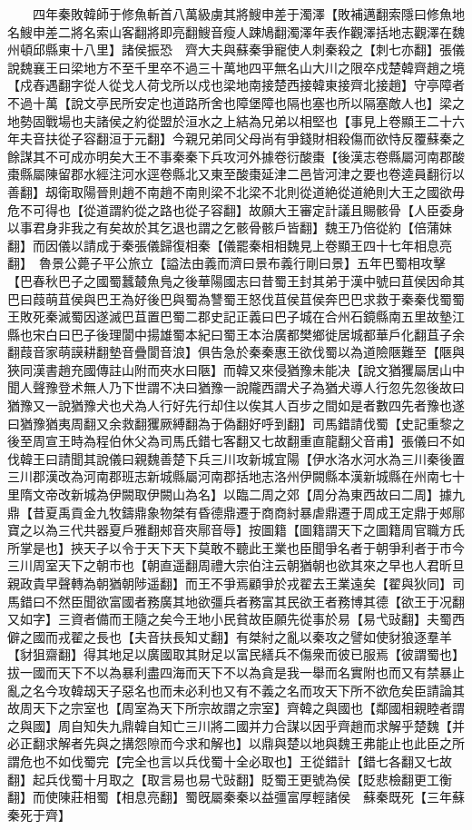 　　四年秦敗韓師于修魚斬首八萬級虜其將䱸申差于濁澤【敗補邁翻索隱曰修魚地名䱸申差二將名索山客翻將即亮翻䱸音瘦人踈鳩翻濁澤年表作觀澤括地志觀澤在魏州頓邱縣東十八里】諸侯振恐　齊大夫與蘇秦爭寵使人刺秦殺之【刺七亦翻】張儀說魏襄王曰梁地方不至千里卒不過三十萬地四平無名山大川之限卒戍楚韓齊趙之境【戍舂遇翻字從人從戈人荷戈所以戍也梁地南接楚西接韓東接齊北接趙】守亭障者不過十萬【說文亭民所安定也道路所舍也障堡障也隔也塞也所以隔塞敵人也】梁之地勢固戰場也夫諸侯之約從盟於洹水之上結為兄弟以相堅也【事見上卷顯王二十六年夫音扶從子容翻洹于元翻】今親兄弟同父母尚有爭錢財相殺傷而欲恃反覆蘇秦之餘謀其不可成亦明矣大王不事秦秦下兵攻河外據卷衍酸棗【後漢志卷縣屬河南郡酸棗縣屬陳留郡水經注河水逕卷縣北又東至酸棗延津二邑皆河津之要也卷逵員翻衍以善翻】刼衛取陽晉則趙不南趙不南則梁不北梁不北則從道絶從道絶則大王之國欲毋危不可得也【從道謂約從之路也從子容翻】故願大王審定計議且賜骸骨【人臣委身以事君身非我之有矣故於其乞退也謂之乞骸骨骸戶皆翻】魏王乃倍從約【倍蒲妹翻】而因儀以請成于秦張儀歸復相秦【儀罷秦相相魏見上卷顯王四十七年相息亮翻】　魯景公薨子平公旅立【謚法由義而濟曰景布義行剛曰景】五年巴蜀相攻擊【巴春秋巴子之國蜀蠶樷魚鳬之後華陽國志曰昔蜀王封其弟于漢中號曰苴侯因命其巴曰葭萌苴侯與巴王為好後巴與蜀為讐蜀王怒伐苴侯苴侯奔巴巴求救于秦秦伐蜀蜀王敗死秦滅蜀因遂滅巴苴置巴蜀二郡史記正義曰巴子城在合州石鏡縣南五里故墊江縣也宋白曰巴子後理閬中揚雄蜀本紀曰蜀王本治廣都樊鄉徙居城都華戶化翻苴子余翻葭音家萌謨耕翻墊音疊閬音浪】俱告急於秦秦惠王欲伐蜀以為道險陿難至【陿與狹同漢書趙充國傳註山附而夾水曰陿】而韓又來侵猶豫未能决【說文猶玃屬居山中聞人聲豫登术無人乃下世謂不决曰猶豫一說隴西謂犬子為猶犬導人行忽先忽後故曰猶豫又一說猶豫犬也犬為人行好先行却住以俟其人百步之間如是者數四先者豫也遂曰猶豫猶夷周翻又余救翻玃厥縛翻為于偽翻好呼到翻】司馬錯請伐蜀【史記重黎之後至周宣王時為程伯休父為司馬氏錯七客翻又七故翻重直龍翻父音甫】張儀曰不如伐韓王曰請聞其說儀曰親魏善楚下兵三川攻新城宜陽【伊水洛水河水為三川秦後置三川郡漢改為河南郡班志新城縣屬河南郡括地志洛州伊闕縣本漢新城縣在州南七十里隋文帝改新城為伊闕取伊闕山為名】以臨二周之郊【周分為東西故曰二周】據九鼎【昔夏禹貢金九牧鑄鼎象物桀有昏德鼎遷于商商紂暴虐鼎遷于周成王定鼎于郟鄏寶之以為三代共器夏戶雅翻郟音夾鄏音辱】按圖籍【圖籍謂天下之圖籍周官職方氏所掌是也】挾天子以令于天下天下莫敢不聽此王業也臣聞爭名者于朝爭利者于市今三川周室天下之朝市也【朝直遥翻周禮大宗伯注云朝猶朝也欲其來之早也人君昕旦親政貴早聲轉為朝猶朝陟遥翻】而王不爭焉顧爭於戎翟去王業遠矣【翟與狄同】司馬錯曰不然臣聞欲富國者務廣其地欲彊兵者務富其民欲王者務博其德【欲王于况翻又如字】三資者備而王隨之矣今王地小民貧故臣願先從事於易【易弋䜴翻】夫蜀西僻之國而戎翟之長也【夫音扶長知丈翻】有桀紂之亂以秦攻之譬如使豺狼逐羣羊【豺狙齋翻】得其地足以廣國取其財足以富民繕兵不傷衆而彼已服焉【彼謂蜀也】拔一國而天下不以為暴利盡四海而天下不以為貪是我一舉而名實附也而又有禁暴止亂之名今攻韓刼天子惡名也而未必利也又有不義之名而攻天下所不欲危矣臣請論其故周天下之宗室也【周室為天下所宗故謂之宗室】齊韓之與國也【鄰國相親睦者謂之與國】周自知失九鼎韓自知亡三川將二國并力合謀以因乎齊趙而求解乎楚魏【并必正翻求解者先與之搆怨隙而今求和解也】以鼎與楚以地與魏王弗能止也此臣之所謂危也不如伐蜀完【完全也言以兵伐蜀十全必取也】王從錯計【錯七各翻又七故翻】起兵伐蜀十月取之【取言易也易弋䜴翻】貶蜀王更號為侯【貶悲檢翻更工衡翻】而使陳莊相蜀【相息亮翻】蜀旣屬秦秦以益彊富厚輕諸侯　蘇秦既死【三年蘇秦死于齊】
